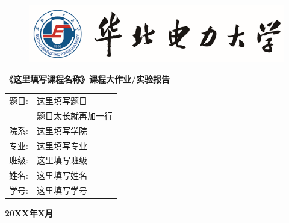 \documentclass[UTF8,zihao=-4,linespread=1.5]{ctexart}
\begin{document}
\begin{titlepage}

    \vspace*{1cm}

    \begin{figure}[h]
        \centering
        \includegraphics[width=\textwidth]{image/xm_pic1.png}
    \end{figure}

    \vspace*{\fill}

    \begin{center}
         \kaishu \bfseries
        《这里填写课程名称》课程大作业/实验报告
    \end{center}

    \vspace{4cm}

    \begin{table}[h]
        \centering
         \kaishu \bfseries
        \begin{tabular}{rp{16em}<{\centering}}
            题目: & 这里填写题目    \\
            \cline{2-2}
                & 题目太长就再加一行 \\
            \cline{2-2}
            院系: & 这里填写学院    \\
            \cline{2-2}
            专业: & 这里填写专业    \\
            \cline{2-2}
            班级: & 这里填写班级    \\
            \cline{2-2}
            姓名: & 这里填写姓名    \\
            \cline{2-2}
            学号: & 这里填写学号    \\
            \cline{2-2}
        \end{tabular}
    \end{table}

    \vspace{1cm}

    \begin{center}
         \kaishu \bfseries
        20XX年X月
    \end{center}

\end{titlepage}
\end{document}

